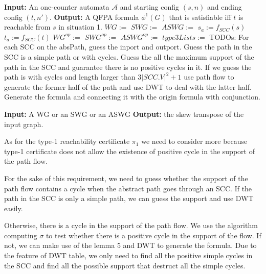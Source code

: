 \documentclass[12pt]{article}
\begin{document}
\begin{itemize}
\begin{algorithm}
\begin{algorithmic}
		
			\State \textbf{Input:} An one-counter automata $\mathcal{A}$ and starting config $(s,n)$ and ending config $(t,n')$.
			\State \textbf{Output:} A QFPA formula $\phi^1(G)$ that is satisfiable iff $t$ is reachable from $s$ in situation 1.
			\State $WG :=$ 
			\State $SWG :=$ 
			\State $ASWG :=$ 
			\State $s_a := f_{SCC}(s)$ 
			\State $t_a := f_{SCC}(t)$ 
			\State $WG^{op} := $
			\State $SWG^{op} := $
			\State $ASWG^{op} := $
			\State $type3Lists :=$ 
							\State TODOs: 
							\State For each SCC on the absPath, guess the inport and outport.
							\State Guess the path in the SCC is a simple path or with cycles.
							\State Guess the all the maximum support of the path in the SCC and guarantee \State there is no positive cycles in it.
							\State If we guess the path is with cycles and length larger than $3|SCC.V|^2 + 1$ \State use path flow to generate the former half of the path and use DWT to deal \State with the latter half.
							\State Generate the formula and connecting it with the origin formula with \State conjunction.
						\EndFor
						
					\EndFor	
				\EndFor
			\EndFor
		\EndFunction
		
		
		\State{}
			\State \textbf{Input:} A WG or an SWG or an ASWG 
			\State \textbf{Output:} the skew transpose of the input graph.
			
		
		\EndFunction
		
		
	\end{algorithmic}
\end{algorithm}

As for the type-1 reachability certificate $\pi_1$ we need to consider more because type-1 certificate does not allow the existence of positive cycle in the support of the path flow.


For the sake of this requirement, we need to guess whether  the support of the path flow contains a cycle when the abstract path goes through an SCC. If the path in the SCC is only a simple path, we can guess the support and use DWT easily. 

Otherwise, there is a cycle in the support of the path flow. We use the algorithm computing $\sigma$ to test whether there is a positive cycle in the support of the flow. If not, we can make use of the lemma 5 and DWT to generate the formula. Due to the feature of DWT table, we only need to find all the positive simple cycles in the SCC and find all the possible support that destruct all the simple cycles.




\end{itemize}
\end{document}
